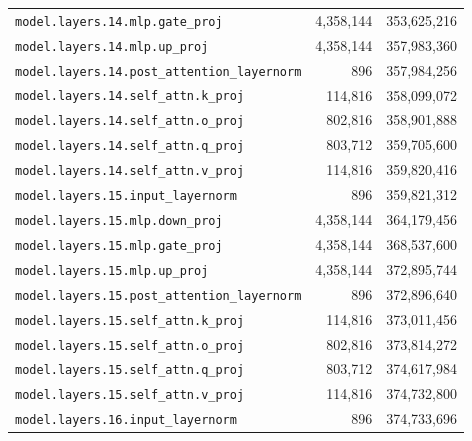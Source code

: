 \documentclass[10pt,a4paper]{article}
\theoremstyle{definition}
\begin{document}
\begin{appendices}
\begin{longtable}{p{9.5cm}rr}
\texttt{model.\allowbreak{}layers.\allowbreak{}14.\allowbreak{}mlp.\allowbreak{}gate\_proj} & 4,358,144 & 353,625,216 \\
\texttt{model.\allowbreak{}layers.\allowbreak{}14.\allowbreak{}mlp.\allowbreak{}up\_proj} & 4,358,144 & 357,983,360 \\
\texttt{model.\allowbreak{}layers.\allowbreak{}14.\allowbreak{}post\_attention\_layernorm} & 896 & 357,984,256 \\
\texttt{model.\allowbreak{}layers.\allowbreak{}14.\allowbreak{}self\_attn.\allowbreak{}k\_proj} & 114,816 & 358,099,072 \\
\texttt{model.\allowbreak{}layers.\allowbreak{}14.\allowbreak{}self\_attn.\allowbreak{}o\_proj} & 802,816 & 358,901,888 \\
\texttt{model.\allowbreak{}layers.\allowbreak{}14.\allowbreak{}self\_attn.\allowbreak{}q\_proj} & 803,712 & 359,705,600 \\
\texttt{model.\allowbreak{}layers.\allowbreak{}14.\allowbreak{}self\_attn.\allowbreak{}v\_proj} & 114,816 & 359,820,416 \\
\texttt{model.\allowbreak{}layers.\allowbreak{}15.\allowbreak{}input\_layernorm} & 896 & 359,821,312 \\
\texttt{model.\allowbreak{}layers.\allowbreak{}15.\allowbreak{}mlp.\allowbreak{}down\_proj} & 4,358,144 & 364,179,456 \\
\texttt{model.\allowbreak{}layers.\allowbreak{}15.\allowbreak{}mlp.\allowbreak{}gate\_proj} & 4,358,144 & 368,537,600 \\
\texttt{model.\allowbreak{}layers.\allowbreak{}15.\allowbreak{}mlp.\allowbreak{}up\_proj} & 4,358,144 & 372,895,744 \\
\texttt{model.\allowbreak{}layers.\allowbreak{}15.\allowbreak{}post\_attention\_layernorm} & 896 & 372,896,640 \\
\texttt{model.\allowbreak{}layers.\allowbreak{}15.\allowbreak{}self\_attn.\allowbreak{}k\_proj} & 114,816 & 373,011,456 \\
\texttt{model.\allowbreak{}layers.\allowbreak{}15.\allowbreak{}self\_attn.\allowbreak{}o\_proj} & 802,816 & 373,814,272 \\
\texttt{model.\allowbreak{}layers.\allowbreak{}15.\allowbreak{}self\_attn.\allowbreak{}q\_proj} & 803,712 & 374,617,984 \\
\texttt{model.\allowbreak{}layers.\allowbreak{}15.\allowbreak{}self\_attn.\allowbreak{}v\_proj} & 114,816 & 374,732,800 \\
\texttt{model.\allowbreak{}layers.\allowbreak{}16.\allowbreak{}input\_layernorm} & 896 & 374,733,696 \\

\end{longtable}
\end{appendices}
\end{document}

